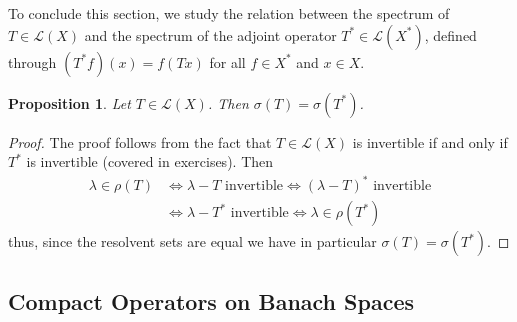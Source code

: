 \documentclass[11pt,a4paper]{article}
\newtheorem{prop}{Proposition}[section]
\theoremstyle{definition}
\begin{document}
\noindent To conclude this section, we study the relation between the spectrum of $T \in \mathcal{L}(X)$ and the spectrum of the adjoint operator $T^* \in \mathcal{L}(X^*)$, defined through $(T^*f)(x) = f(Tx)$ for all $f \in X^*$ and $x \in X$. 
\begin{prop} Let $T \in \mathcal{L}(X)$. Then $\sigma(T)= \sigma(T^*)$. 
\end{prop}
\begin{proof}
The proof follows from the fact that $T \in \mathcal{L}(X)$ is invertible if and only if $T^*$ is invertible (covered in exercises). Then 
\begin{align*}
\lambda \in \rho (T) &\iff \lambda-T \text{ invertible} \iff ( \lambda- T)^* \text{ invertible} \\
& \iff \lambda-T^* \text{ invertible} \iff \lambda \in \rho(T^*)
\end{align*}
thus, since the resolvent sets are equal we have in particular $\sigma(T)= \sigma(T^*)$. 
\end{proof}
\newpage
\subsection{Compact Operators on Banach Spaces}
\end{document}
